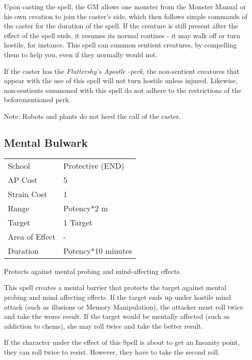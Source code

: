 \documentclass[11pt,a4paper,twocolumn]{book}
\begin{document}
Upon casting the spell, the GM allows one monster from the Monster Manual or his own creation to join the caster's side, which then follows simple commands of the caster for the duration of the spell. If the creature is still present after the effect of the spell ends, it resumes its normal routines - it may walk off or turn hostile, for instance. This spell can summon sentient creatures, by compelling them to help you, even if they normally would not. 

If the caster has the \textit{Fluttershy's Apostle -perk}, the non-sentient creatures that appear with the use of this spell will not turn hostile unless injured. Likewise, non-sentients summoned with this spell do not adhere to the restrictions of the beforementioned perk.

Note: Robots and plants do not heed the call of the caster.

\bigskip

\subsection*{Mental Bulwark}
{
	\begin{tabu} to 75mm{| X[l,4] | X[l,7] |}
		\hline
		School 			& Protective (END) 		\\
		AP Cost	      	& 5 					\\
		Strain Cost     & 1 					\\
		Range     		& Potency*2 m				\\
		Target      	& 1 Target				\\
		Area of Effect  & -  	 				\\
		Duration     	& Potency*10 minutes	\\ \hline
	\end{tabu}
	
}

\medskip

Protects against mental probing and mind-affecting effects.

This spell creates a mental barrier that protects the target against mental probing and mind affecting effects. If the target ends up under hostile mind attack (such as illusions or Memory Manipulation), the attacker must roll twice and take the worse result. If the target would be mentally affected (such as addiction to chems), she may roll twice and take the better result. 

If the character under the effect of this Spell is about to get an Insanity point, they can roll twice to resist. However, they have to take the second roll.
\end{document}
